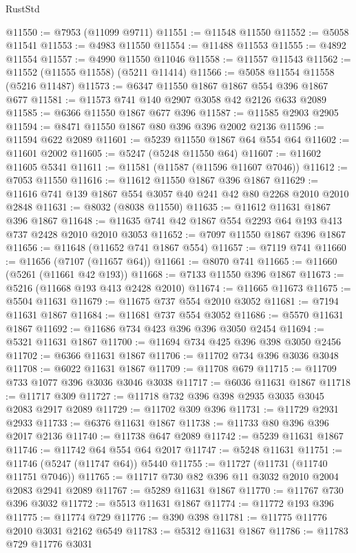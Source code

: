 \begin{lexlean}{RustStd}
\begin{coremodule}
@11550 := @7953 (@11099 @9711)
@11551 := @11548 @11550
@11552 := @5058 @11541
@11553 := @4983 @11550
@11554 := @11488 @11553
@11555 := @4892 @11554
@11557 := @4990 @11550 @11046
@11558 := @11557 @11543
@11562 := @11552 (@11555 @11558) (@5211 @11414)
@11566 := @5058 @11554 @11558 (@5216 @11487)
@11573 := @6347 @11550 @1867 @1867 @554 @396 @1867 @677
@11581 := @11573 @741 @140 @2907 @3058 @42 @2126 @633 @2089
@11585 := @6366 @11550 @1867 @677 @396
@11587 := @11585 @2903 @2905
@11594 := @8471 @11550 @1867 @80 @396 @396 @2002 @2136
@11596 := @11594 @622 @2089
@11601 := @5239 @11550 @1867 @64 @554 @64
@11602 := @11601 @2002
@11605 := @5247 (@5248 @11550 @64)
@11607 := @11602 @11605 @5341
@11611 := @11581 (@11587 (@11596 @11607 @7046))
@11612 := @7053 @11550
@11616 := @11612 @11550 @1867 @396 @1867
@11629 := @11616 @741 @139 @1867 @554 @3057 @40 @241 @42 @80 @2268 @2010 @2010 @2848
@11631 := @8032 (@8038 @11550)
@11635 := @11612 @11631 @1867 @396 @1867
@11648 := @11635 @741 @42 @1867 @554 @2293 @64 @193 @413 @737 @2428 @2010 @2010 @3053
@11652 := @7097 @11550 @1867 @396 @1867
@11656 := @11648 (@11652 @741 @1867 @554)
@11657 := @7119 @741
@11660 := @11656 (@7107 (@11657 @64))
@11661 := @8070 @741
@11665 := @11660 (@5261 (@11661 @42 @193))
@11668 := @7133 @11550 @396 @1867
@11673 := @5216 (@11668 @193 @413 @2428 @2010)
@11674 := @11665 @11673
@11675 := @5504 @11631
@11679 := @11675 @737 @554 @2010 @3052
@11681 := @7194 @11631 @1867
@11684 := @11681 @737 @554 @3052
@11686 := @5570 @11631 @1867
@11692 := @11686 @734 @423 @396 @396 @3050 @2454
@11694 := @5321 @11631 @1867
@11700 := @11694 @734 @425 @396 @398 @3050 @2456
@11702 := @6366 @11631 @1867
@11706 := @11702 @734 @396 @3036 @3048
@11708 := @6022 @11631 @1867
@11709 := @11708 @679
@11715 := @11709 @733 @1077 @396 @3036 @3046 @3038
@11717 := @6036 @11631 @1867
@11718 := @11717 @309
@11727 := @11718 @732 @396 @398 @2935 @3035 @3045 @2083 @2917 @2089
@11729 := @11702 @309 @396
@11731 := @11729 @2931 @2933
@11733 := @6376 @11631 @1867
@11738 := @11733 @80 @396 @396 @2017 @2136
@11740 := @11738 @647 @2089
@11742 := @5239 @11631 @1867
@11746 := @11742 @64 @554 @64 @2017
@11747 := @5248 @11631
@11751 := @11746 (@5247 (@11747 @64)) @5440
@11755 := @11727 (@11731 (@11740 @11751 @7046))
@11765 := @11717 @730 @82 @396 @11 @3032 @2010 @2004 @2083 @2941 @2089
@11767 := @5289 @11631 @1867
@11770 := @11767 @730 @396 @3032
@11772 := @5513 @11631 @1867
@11774 := @11772 @193 @396
@11775 := @11774 @729
@11776 := @390 @398
@11781 := @11775 @11776 @2010 @3031 @2162 @6549
@11783 := @5312 @11631 @1867
@11786 := @11783 @729 @11776 @3031

\end{coremodule}
\end{lexlean}
